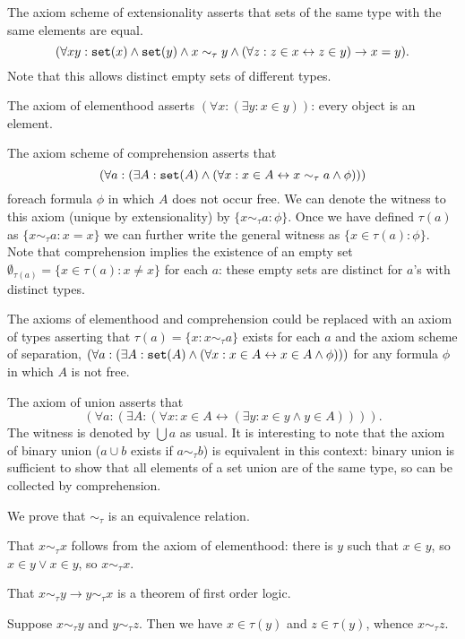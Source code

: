 \documentclass[12pt]{article}
\begin{document}
The axiom scheme of extensionality asserts that sets of the same type  with the same elements are equal.  $$(\forall xy:{\tt set}(x) \wedge {\tt set}(y) \wedge x \sim_{\tau} y \wedge (\forall z:z \in x \leftrightarrow z \in y) \rightarrow x=y).$$  Note that this allows distinct empty sets of different types.

The axiom of elementhood asserts $(\forall x:(\exists y:x \in y))$:  every object is an element.

The axiom scheme of comprehension asserts that $$(\forall a:(\exists A:{\tt set}(A) \wedge (\forall x:x \in A \leftrightarrow x \sim_{\tau} a \wedge \phi)))$$ foreach  formula $\phi$ in which $A$ does not occur free.
We can denote the witness to this axiom (unique by extensionality) by $\{x \sim_{\tau} a:\phi\}$.  Once we have defined $\tau(a)$ as $\{x \sim_{\tau} a:x=x\}$ we can further
write the general witness as $\{x \in \tau(a):\phi\}$.  Note that comprehension implies the existence of an empty set $\emptyset_{\tau(a)} = \{x \in \tau(a):x \neq x\}$ for each $a$:  these empty sets
are distinct for $a$'s with distinct types.

The axioms of elementhood and comprehension could be replaced with an axiom of types asserting that $\tau(a) =\{x:x \sim_{\tau}a\}$ exists for each $a$ and the axiom scheme of separation, $(\forall a:(\exists A:{\tt set}(A) \wedge (\forall x:x \in A \leftrightarrow x \in A \wedge \phi)))$ for any formula $\phi$ in which $A$ is not free.

The axiom of union asserts that $$(\forall a:(\exists A:(\forall x:x \in A \leftrightarrow (\exists y:x \in y \wedge y \in A)))).$$  The witness is denoted by $\bigcup a$ as usual.  It is interesting to note that the axiom of binary union ($a \cup b$ exists if $a \sim_{\tau} b$) is equivalent in this context:  binary union is sufficient to show that all elements of a set union are of the same type, so can be collected by comprehension.

We prove that $\sim_{\tau}$ is an equivalence relation.

That $x \sim_{\tau} x$ follows from the axiom of elementhood: there is $y$ such that $x \in y$, so $x \in y \vee x \in y$, so $x \sim_{\tau} x$.

That $x \sim_{\tau} y \rightarrow y \sim_{\tau} x$ is a theorem of first order logic.

Suppose $x \sim_{\tau} y$ and $y \sim_{\tau} z$.  Then we have $x \in \tau(y)$ and $z \in \tau(y)$, whence $x \sim_{\tau} z$.
\end{document}
